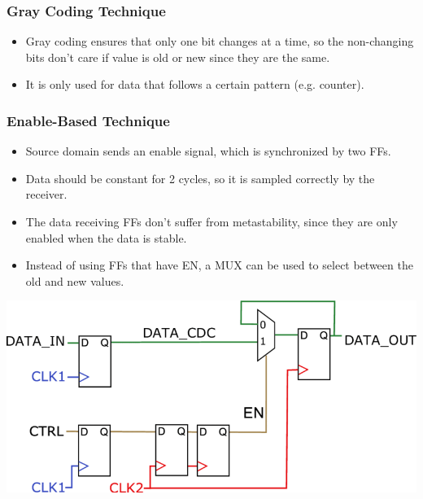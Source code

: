 \documentclass[11pt]{article}
\begin{document}
\subsubsection*{Gray Coding Technique}
\begin{itemize}
    \item Gray coding ensures that only one bit changes at a time, so the non-changing bits don't care if value is old or new since they are the same.
    \item It is only used for data that follows a certain pattern (e.g. counter).
\end{itemize}

\subsubsection*{Enable-Based Technique}
\begin{itemize}
    \item Source domain sends an enable signal, which is synchronized by two FFs.
    \item Data should be constant for 2 cycles, so it is sampled correctly by the receiver.
    \item The data receiving FFs don't suffer from metastability, since they are only enabled when the data is stable.
    \item Instead of using FFs that have EN, a MUX can be used to select between the old and new values.
\end{itemize}
\begin{center}
    \includegraphics[scale=0.25]{3.png}
\end{center}
\end{document}
